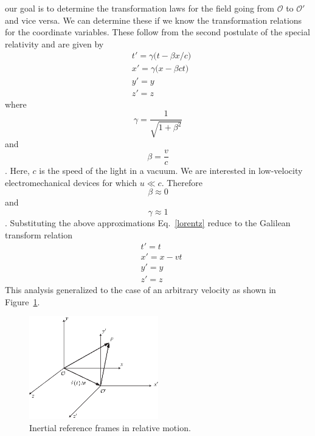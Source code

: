 \documentclass[11pt,a4paper,oneside]{book}
\numberwithin{equation}{section}
\theoremstyle{it}
\theoremstyle{definition}
\begin{document}
our goal is to determine the transformation laws for the field going from $\mathcal{O}$ to $\mathcal{O'}$ and vice versa. We can determine these if we know the transformation relations for the coordinate variables. These follow from the second postulate of the special relativity and are given by
 \begin{equation}\label{lorentz}
 	\begin{aligned}
 		&t'=\gamma\big(t-\beta x/c\big) \\[6pt]
 		&x'=\gamma\big(x-\beta ct\big) \\[6pt] 		
 		&y'=y \\[6pt]
		&z'=z
 	\end{aligned}
 \end{equation} 
where $$ \gamma=\frac{1}{\sqrt{1+\beta^2}} $$ and $$\beta=\frac{v}{c} $$. Here, $c$ is the speed of the light in a vacuum. We are interested in low-velocity electromechanical devices for which $u\ll c$. Therefore $$\beta\approx 0$$ and $$\gamma\approx 1$$.
Substituting the above approximations Eq.~\eqref{lorentz} reduce to the Galilean transform relation
  \begin{equation}\label{galileo}
 	\begin{aligned}
 		&t'=t \\[6pt]
 		&x'=x - vt \\[6pt] 		
 		&y'=y \\[6pt]
 		&z'=z
 	\end{aligned}
 \end{equation} 
This analysis generalized to the case of an arbitrary velocity as shown in Figure~\ref{inertial_ref_frame_space}.
\begin{figure}[H]
	\centering
	\includegraphics[width = 0.5\textwidth, width = 250pt, angle = 0, keepaspectratio]{figures/traslating_reference_frame_space.eps}
	\captionsetup{width=0.75\textwidth}		
	\caption{Inertial reference frames in relative motion.}
	\label{inertial_ref_frame_space}
\end{figure}
\end{document}

